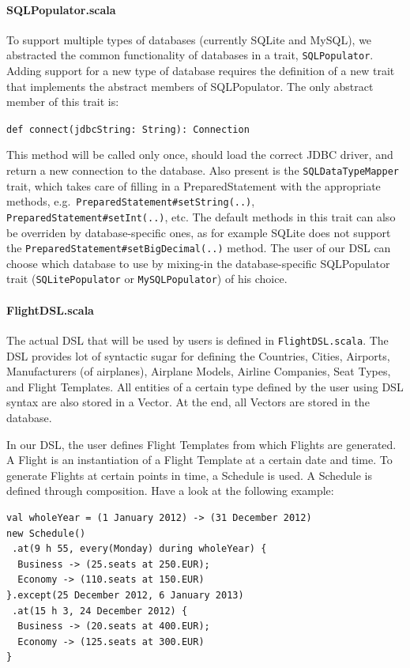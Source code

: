 \documentclass[a4paper]{article}
\newcommand{\code}[1]{%
    \lstinline[%
               flexiblecolumns=true,%
               basicstyle=\ttfamily]#1}
\newcommand{\cc}[1]{\texttt{#1}}
\renewcommand{\sc}[1]{\lstinline{#1}}
\begin{document}
\paragraph{SQLPopulator.scala}
To support multiple types of databases (currently SQLite and MySQL), we abstracted the common functionality of databases in a trait, \cc{SQL\-Populator}.
Adding support for a new type of database requires the definition of a new trait that implements the abstract members of SQLPopulator.
The only abstract member of this trait is:

\sc{def connect(jdbcString: String): Connection}

This method will be called only once, should load the correct JDBC driver, and return a new connection to the database.
Also present is the \cc{SQLDataTypeMapper} trait, which takes care of filling in a PreparedStatement with the appropriate methods, e.g.\ \cc{Prepared\-State\-ment\-\#set\-String(..)}, \cc{Prepared\-State\-ment\-\#set\-Int(..)}, etc.
The default methods in this trait can also be overriden by database-specific ones, as for example SQLite does not support the \cc{Prepared\-State\-ment\-\#set\-Big\-Decimal(..)} method.
The user of our DSL can choose which database to use by mixing-in the database-specific SQLPopulator trait (\cc{SQLitePopulator} or \cc{MySQL\-Populator}) of his choice.

\paragraph{FlightDSL.scala}
The actual DSL that will be used by users is defined in \cc{Flight\-DSL.scala}.
The DSL provides lot of syntactic sugar for defining the Countries, Cities, Airports, Manufacturers (of airplanes), Airplane Models, Airline Companies, Seat Types, and Flight Templates.
All entities of a certain type defined by the user using DSL syntax are also stored in a Vector.
At the end, all Vectors are stored in the database.

In our DSL, the user defines Flight Templates from which Flights are generated.
A Flight is an instantiation of a Flight Template at a certain date and time.
To generate Flights at certain points in time, a Schedule is used.
A Schedule is defined through composition.
Have a look at the following example:
\begin{lstlisting}
val wholeYear = (1 January 2012) -> (31 December 2012)
new Schedule()
 .at(9 h 55, every(Monday) during wholeYear) {
  Business -> (25.seats at 250.EUR);
  Economy -> (110.seats at 150.EUR)
}.except(25 December 2012, 6 January 2013)
 .at(15 h 3, 24 December 2012) {
  Business -> (20.seats at 400.EUR);
  Economy -> (125.seats at 300.EUR)
}
\end{lstlisting}
\end{document}
